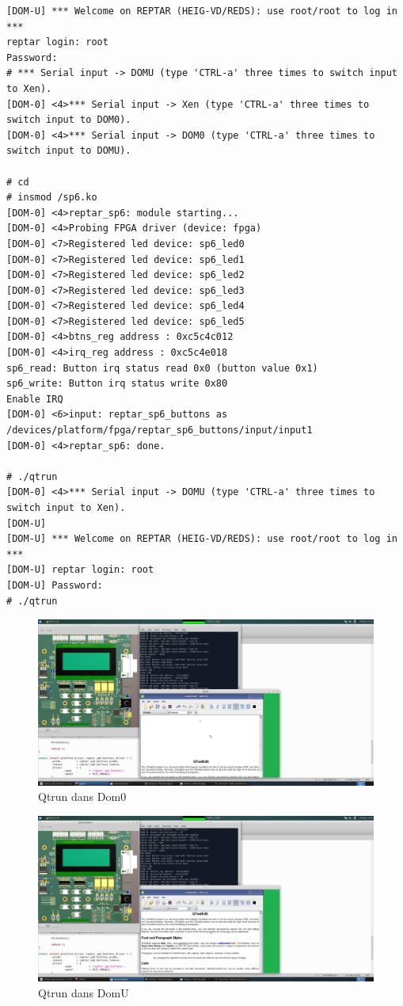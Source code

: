 \begin{lstlisting}
[DOM-U] *** Welcome on REPTAR (HEIG-VD/REDS): use root/root to log in ***
reptar login: root
Password: 
# *** Serial input -> DOMU (type 'CTRL-a' three times to switch input to Xen).
[DOM-0] <4>*** Serial input -> Xen (type 'CTRL-a' three times to switch input to DOM0).
[DOM-0] <4>*** Serial input -> DOM0 (type 'CTRL-a' three times to switch input to DOMU).

# cd
# insmod /sp6.ko 
[DOM-0] <4>reptar_sp6: module starting...
[DOM-0] <4>Probing FPGA driver (device: fpga)
[DOM-0] <7>Registered led device: sp6_led0
[DOM-0] <7>Registered led device: sp6_led1
[DOM-0] <7>Registered led device: sp6_led2
[DOM-0] <7>Registered led device: sp6_led3
[DOM-0] <7>Registered led device: sp6_led4
[DOM-0] <7>Registered led device: sp6_led5
[DOM-0] <4>btns_reg address : 0xc5c4c012
[DOM-0] <4>irq_reg address : 0xc5c4e018
sp6_read: Button irq status read 0x0 (button value 0x1)
sp6_write: Button irq status write 0x80
Enable IRQ
[DOM-0] <6>input: reptar_sp6_buttons as /devices/platform/fpga/reptar_sp6_buttons/input/input1
[DOM-0] <4>reptar_sp6: done.

# ./qtrun
[DOM-0] <4>*** Serial input -> DOMU (type 'CTRL-a' three times to switch input to Xen).
[DOM-U] 
[DOM-U] *** Welcome on REPTAR (HEIG-VD/REDS): use root/root to log in ***
[DOM-U] reptar login: root 
[DOM-U] Password: 
# ./qtrun 
\end{lstlisting}
\begin{figure}[H]
	\begin{center}
		\includegraphics[width=16cm]{img/dom02.png}
		\caption{Qtrun dans Dom0}
		\label{qtrun2}
	\end{center}
\end{figure}
\begin{figure}[H]
	\begin{center}
		\includegraphics[width=16cm]{img/dom03.png}
		\caption{Qtrun dans DomU}
		\label{qtrun3}
	\end{center}
\end{figure}
